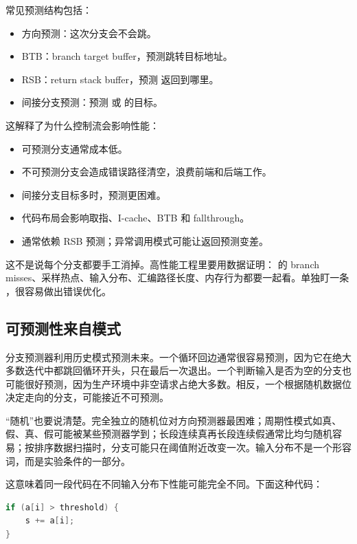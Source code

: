 常见预测结构包括：

\begin{itemize}
  \item 方向预测：这次分支会不会跳。
  \item BTB：branch target buffer，预测跳转目标地址。
  \item RSB：return stack buffer，预测  返回到哪里。
  \item 间接分支预测：预测  或  的目标。
\end{itemize}

这解释了为什么控制流会影响性能：

\begin{itemize}
  \item 可预测分支通常成本低。
  \item 不可预测分支会造成错误路径清空，浪费前端和后端工作。
  \item 间接分支目标多时，预测更困难。
  \item 代码布局会影响取指、I-cache、BTB 和 fallthrough。
  \item {} 通常依赖 RSB 预测；异常调用模式可能让返回预测变差。
\end{itemize}

\begin{deepdive}
这不是说每个分支都要手工消掉。高性能工程里要用数据证明： 的 branch misses、采样热点、输入分布、汇编路径长度、内存行为都要一起看。单独盯一条 ，很容易做出错误优化。
\end{deepdive}

\subsection{可预测性来自模式}

分支预测器利用历史模式预测未来。一个循环回边通常很容易预测，因为它在绝大多数迭代中都跳回循环开头，只在最后一次退出。一个判断输入是否为空的分支也可能很好预测，因为生产环境中非空请求占绝大多数。相反，一个根据随机数据位决定走向的分支，可能接近不可预测。

“随机”也要说清楚。完全独立的随机位对方向预测器最困难；周期性模式如真、假、真、假可能被某些预测器学到；长段连续真再长段连续假通常比均匀随机容易；按排序数据扫描时，分支可能只在阈值附近改变一次。输入分布不是一个形容词，而是实验条件的一部分。

这意味着同一段代码在不同输入分布下性能可能完全不同。下面这种代码：

\begin{lstlisting}[language=C++]
if (a[i] > threshold) {
    s += a[i];
}
\end{lstlisting}

